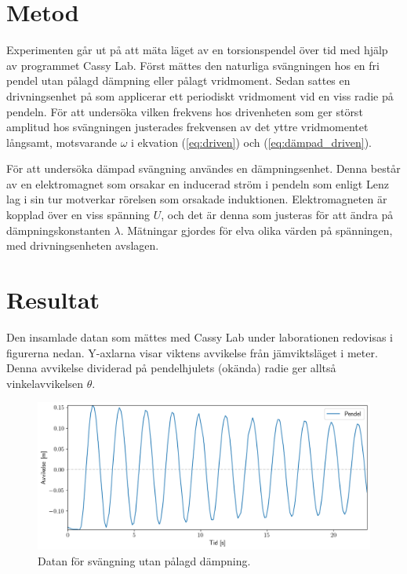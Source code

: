 \documentclass[12pt, a4paper]{article}
\begin{document}
\section{Metod}
Experimenten går ut på att mäta läget av en torsionspendel över tid med hjälp av programmet Cassy Lab. Först mättes den naturliga svängningen hos en fri pendel utan pålagd dämpning eller pålagt vridmoment. Sedan sattes en drivningsenhet på som applicerar ett periodiskt vridmoment vid en viss radie på pendeln. För att undersöka vilken frekvens hos drivenheten som ger störst amplitud hos svängningen justerades frekvensen av det yttre vridmomentet långsamt, motsvarande $\omega$ i ekvation (\ref{eq:driven}) och (\ref{eq:dämpad_driven}). 

För att undersöka dämpad svängning användes en dämpningsenhet. Denna består av en elektromagnet som orsakar en inducerad ström i pendeln som enligt Lenz lag i sin tur motverkar rörelsen som orsakade induktionen. Elektromagneten är kopplad över en viss spänning $U$, och det är denna som justeras för att ändra på dämpningskonstanten $\lambda$. Mätningar gjordes för elva olika värden på spänningen, med drivningsenheten avslagen.

\clearpage
\section{Resultat}
Den insamlade datan som mättes med Cassy Lab under laborationen redovisas i figurerna nedan. Y-axlarna visar viktens avvikelse från jämviktsläget i meter. Denna avvikelse dividerad på pendelhjulets (okända) radie ger alltså vinkelavvikelsen $\theta$.

\begin{figure}[hp]
	\includegraphics[width=\textwidth]{graf_egenfrekvens}
	\caption{Datan för svängning utan pålagd dämpning.}
	\label{fig:data_egenfrekvens}
\end{figure}
\end{document}
